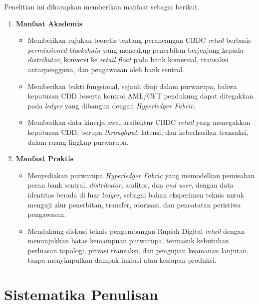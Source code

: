 Penelitian ini diharapkan memberikan manfaat sebagai berikut.
\begin{enumerate}
	\item \textbf{Manfaat Akademis}\nopagebreak
		\begin{itemize}
			\item Memberikan rujukan teoretis tentang perancangan CBDC \textit{retail} berbasis \textit{permissioned blockchain} yang mencakup penerbitan berjenjang kepada \textit{distributor}, konversi ke \textit{retail float} pada bank komersial, transaksi antarpengguna, dan pengawasan oleh bank sentral.
			\item Memberikan bukti fungsional, sejauh diuji dalam purwarupa, bahwa keputusan CDD beserta kontrol AML/CFT pendukung dapat ditegakkan pada \textit{ledger} yang dibangun dengan \textit{Hyperledger Fabric}.
			\item Memberikan data kinerja awal arsitektur CBDC \textit{retail} yang menegakkan keputusan CDD, berupa \textit{throughput}, latensi, dan keberhasilan transaksi, dalam ruang lingkup purwarupa.
		\end{itemize}
	\item \textbf{Manfaat Praktis}\nopagebreak
		\begin{itemize}
			\item Menyediakan purwarupa \textit{Hyperledger Fabric} yang memodelkan pemisahan peran bank sentral, \textit{distributor}, auditor, dan \textit{end user}, dengan data identitas berada di luar \textit{ledger}, sebagai bahan eksperimen teknis untuk menguji alur penerbitan, transfer, otorisasi, dan pencatatan peristiwa pengawasan.
			\item Mendukung diskusi teknis pengembangan Rupiah Digital \textit{retail} dengan menunjukkan batas kemampuan purwarupa, termasuk kebutuhan perluasan topologi, privasi transaksi, dan pengujian keamanan lanjutan, tanpa menyimpulkan dampak inklusi atau kesiapan produksi.
		\end{itemize}
\end{enumerate}

\section{Sistematika Penulisan}

